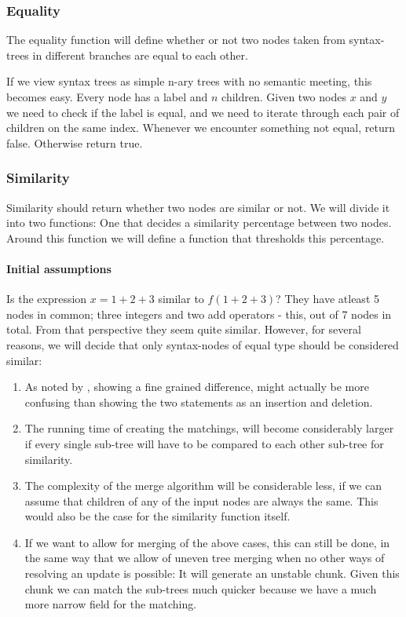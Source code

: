 \documentclass[11pt]{article}
\begin{document}
\subsubsection{Equality}
The equality function will define whether or not two nodes taken from syntax-trees in different branches are equal to each other.

If we view syntax trees as simple n-ary trees with no semantic meeting, this becomes easy. Every node has a label and $n$ children. Given two nodes $x$ and $y$ we need to check if the label is equal, and we need to iterate through each pair of children on the same index. Whenever we encounter something not equal, return false. Otherwise return true.

\subsubsection{Similarity}
\label{FunctionSimilarity}
Similarity should return whether two nodes are similar or not. We will divide it into two functions:  One that decides a similarity percentage between two nodes. Around this function we will define a function that thresholds this percentage.

\paragraph{Initial assumptions} Is the expression $x=1+2+3$ similar to $f(1+2+3)$? They have atleast 5 nodes in common; three integers and two add operators - this, out of 7 nodes in total. From that perspective they seem quite similar. However, for several reasons, we will decide that only syntax-nodes of equal type should be considered similar:

\begin{enumerate}
\item As noted by \citet{Hashimoto}, showing a fine grained difference, might actually be more confusing than showing the two statements as an insertion and deletion.
\item The running time of creating the matchings, will become considerably larger if every single sub-tree will have to be compared to each other sub-tree for similarity.
\item The complexity of the merge algorithm will be considerable less, if we can assume that children of any of the input nodes are always the same. This would also be the case for the similarity function itself.
\item If we want to allow for merging of the above cases, this can still be done, in the same way that we allow of uneven tree merging when no other ways of resolving an update is possible: It will generate an unstable chunk. Given this chunk we can match the sub-trees much quicker because we have a much more narrow field for the matching.
\end{enumerate}
\end{document}
